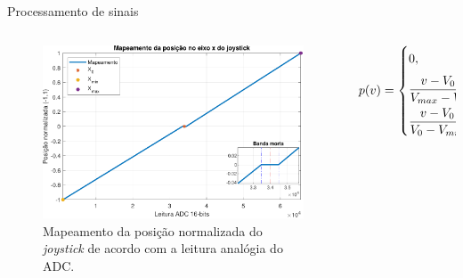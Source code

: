 \documentclass{if-beamer}
\begin{document}
\begin{frame}{Processamento de sinais}
	
	\begin{columns}
		
		\begin{column}{0.5\textwidth}
			
			
			\begin{figure}
				\centering
				\includegraphics[width=1.1\linewidth]{plot_joy_x_axis.pdf}
				\caption{Mapeamento da posição normalizada do \textit{joystick} de acordo com a leitura analógia do ADC.}
				\label{fig:plotjoyxaxis}
			\end{figure}
			
		\end{column}
	
\pause
		
		\begin{column}{0.6\textwidth}
			
			\begin{equation}\label{eq:joy}
				p(v) = \begin{dcases}
					0\vphantom{\frac{0}{0}}, &\text{se } - B \le v - V_0 \le B \\
					\frac{v - V_0 - B}{V_{max} - V_0 - B}, &\text{se } v > V_0 + B \\
					\frac{v - V_0 + B}{V_0 - V_{min} - B}, &\text{se } v < V_0 - B 
				\end{dcases}
			\end{equation}
			
		\end{column}
		
	\end{columns}
	
\end{frame}
\end{document}
